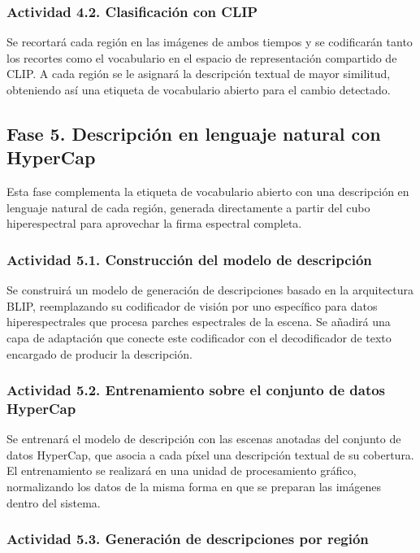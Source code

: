 \documentclass[12pt,onecolumn]{IEEEtran}
\begin{document}
\subsubsection{{Actividad 4.2. Clasificación con CLIP}}

Se recortará cada región en las imágenes de ambos tiempos y se codificarán tanto los recortes como el vocabulario en el espacio de representación compartido de CLIP. A cada región se le asignará la descripción textual de mayor similitud, obteniendo así una etiqueta de vocabulario abierto para el cambio detectado.

\subsection{{Fase 5. Descripción en lenguaje natural con HyperCap}}
Esta fase complementa la etiqueta de vocabulario abierto con una descripción en lenguaje natural de cada región, generada directamente a partir del cubo hiperespectral para aprovechar la firma espectral completa.

\subsubsection{{Actividad 5.1. Construcción del modelo de descripción}}

Se construirá un modelo de generación de descripciones basado en la arquitectura BLIP, reemplazando su codificador de visión por uno específico para datos hiperespectrales que procesa parches espectrales de la escena. Se añadirá una capa de adaptación que conecte este codificador con el decodificador de texto encargado de producir la descripción.

\subsubsection{{Actividad 5.2. Entrenamiento sobre el conjunto de datos HyperCap}}

Se entrenará el modelo de descripción con las escenas anotadas del conjunto de datos HyperCap, que asocia a cada píxel una descripción textual de su cobertura. El entrenamiento se realizará en una unidad de procesamiento gráfico, normalizando los datos de la misma forma en que se preparan las imágenes dentro del sistema.

\subsubsection{{Actividad 5.3. Generación de descripciones por región}}
\end{document}
